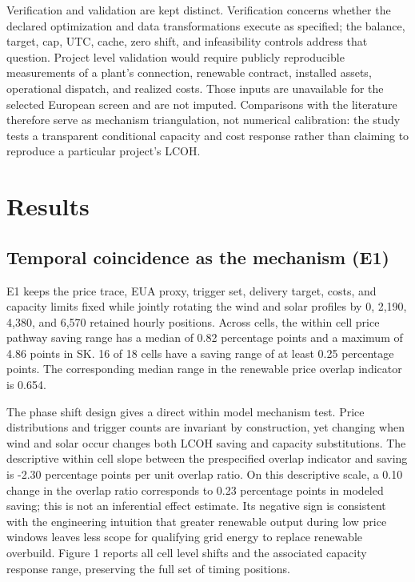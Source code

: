 \documentclass[largeformat]{interact}
\begin{document}
Verification and validation are kept distinct. Verification concerns
whether the declared optimization and data transformations execute as
specified; the balance, target, cap, UTC, cache, zero shift, and
infeasibility controls address that question. Project level validation
would require publicly reproducible measurements of a plant's
connection, renewable contract, installed assets, operational dispatch,
and realized costs. Those inputs are unavailable for the selected
European screen and are not imputed. Comparisons with the literature
therefore serve as mechanism triangulation, not numerical calibration:
the study tests a transparent conditional capacity and cost response
rather than claiming to reproduce a particular project's LCOH.

\section{Results}\label{results}

\subsection{Temporal coincidence as the mechanism
(E1)}\label{temporal-coincidence-as-the-mechanism-e1}

E1 keeps the price trace, EUA proxy, trigger set, delivery target,
costs, and capacity limits fixed while jointly rotating the wind and
solar profiles by 0, 2,190, 4,380, and 6,570 retained hourly positions.
Across cells, the within cell price pathway saving range has a median of
0.82 percentage points and a maximum of 4.86 points in SK. 16 of 18
cells have a saving range of at least 0.25 percentage points. The
corresponding median range in the renewable price overlap indicator is
0.654.

The phase shift design gives a direct within model mechanism test. Price
distributions and trigger counts are invariant by construction, yet
changing when wind and solar occur changes both LCOH saving and capacity
substitutions. The descriptive within cell slope between the
prespecified overlap indicator and saving is -2.30 percentage points per
unit overlap ratio. On this descriptive scale, a 0.10 change in the
overlap ratio corresponds to 0.23 percentage points in modeled saving;
this is not an inferential effect estimate. Its negative sign is
consistent with the engineering intuition that greater renewable output
during low price windows leaves less scope for qualifying grid energy to
replace renewable overbuild. Figure 1 reports all cell level shifts and
the associated capacity response range, preserving the full set of
timing positions.
\end{document}
